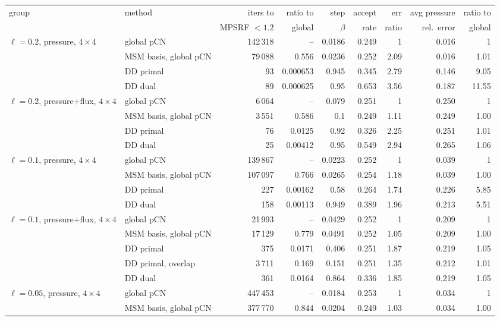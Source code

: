 \begin{tabular}{llrrrrrrr}
\toprule
group & method & iters to & ratio to & step & accept & err & avg pressure & ratio to \\
 & & MPSRF $<1.2$ & global & $\beta$ & rate & ratio & rel.\ error & global \\
\midrule
$\ell=0.2$, pressure, $4\times4$ & global pCN & 142\,318 & -- & 0.0186 & 0.249 & 1 & 0.016 & 1 \\
 & MSM basis, global pCN & 79\,088 & 0.556 & 0.0236 & 0.252 & 2.09 & 0.016 & 1.01 \\
 & DD primal & 93 & 0.000653 & 0.945 & 0.345 & 2.79 & 0.146 & 9.05 \\
 & DD dual & 89 & 0.000625 & 0.95 & 0.653 & 3.56 & 0.187 & 11.55 \\
\addlinespace
$\ell=0.2$, pressure+flux, $4\times4$ & global pCN & 6\,064 & -- & 0.079 & 0.251 & 1 & 0.250 & 1 \\
 & MSM basis, global pCN & 3\,551 & 0.586 & 0.1 & 0.249 & 1.11 & 0.249 & 1.00 \\
 & DD primal & 76 & 0.0125 & 0.92 & 0.326 & 2.25 & 0.251 & 1.01 \\
 & DD dual & 25 & 0.00412 & 0.95 & 0.549 & 2.94 & 0.265 & 1.06 \\
\addlinespace
$\ell=0.1$, pressure, $4\times4$ & global pCN & 139\,867 & -- & 0.0223 & 0.252 & 1 & 0.039 & 1 \\
 & MSM basis, global pCN & 107\,097 & 0.766 & 0.0265 & 0.254 & 1.18 & 0.039 & 1.00 \\
 & DD primal & 227 & 0.00162 & 0.58 & 0.264 & 1.74 & 0.226 & 5.85 \\
 & DD dual & 158 & 0.00113 & 0.949 & 0.389 & 1.96 & 0.213 & 5.51 \\
\addlinespace
$\ell=0.1$, pressure+flux, $4\times4$ & global pCN & 21\,993 & -- & 0.0429 & 0.252 & 1 & 0.209 & 1 \\
 & MSM basis, global pCN & 17\,129 & 0.779 & 0.0491 & 0.252 & 1.05 & 0.209 & 1.00 \\
 & DD primal & 375 & 0.0171 & 0.406 & 0.251 & 1.87 & 0.219 & 1.05 \\
 & DD primal, overlap & 3\,711 & 0.169 & 0.151 & 0.251 & 1.35 & 0.212 & 1.01 \\
 & DD dual & 361 & 0.0164 & 0.864 & 0.336 & 1.85 & 0.219 & 1.05 \\
\addlinespace
$\ell=0.05$, pressure, $4\times4$ & global pCN & 447\,453 & -- & 0.0184 & 0.253 & 1 & 0.034 & 1 \\
 & MSM basis, global pCN & 377\,770 & 0.844 & 0.0204 & 0.249 & 1.03 & 0.034 & 1.00 \\

\end{tabular}
